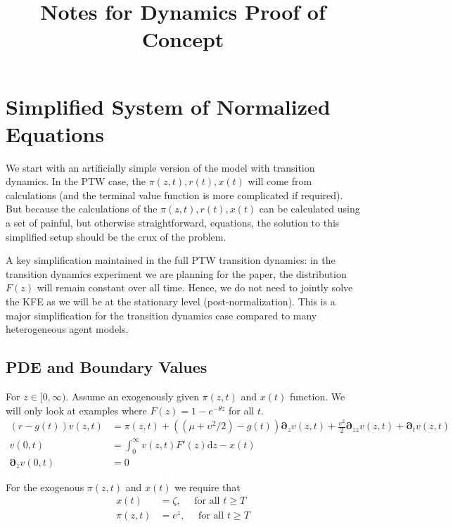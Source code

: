 \documentclass[11pt]{article}
\newcommand{\D}[1][]{\ensuremath{\boldsymbol{\partial}_{#1}}}
\newcommand{\diff}{\ensuremath{\mathrm{d}}}
\begin{document}
\title{Notes for Dynamics Proof of Concept}
\maketitle

\section{Simplified System of Normalized Equations}
We start with an artificially simple version of the model with transition dynamics.  In the PTW case, the $\pi(z,t), r(t), x(t)$ will come from  calculations (and the terminal value function is more complicated if required).  But because the calculations of the $\pi(z,t), r(t), x(t)$ can be calculated using a set of painful, but otherwise straightforward, equations, the solution to this simplified setup should be the crux of the problem.

A key simplification maintained in the full PTW transition dynamics: in the transition dynamics experiment we are planning for the paper, the distribution $F(z)$ will remain constant over all time.  Hence, we do not need to jointly solve the KFE as we will be at the stationary level (post-normalization).  This is a major simplification for the transition dynamics case compared to many heterogeneous agent models.

\subsection{PDE and Boundary Values}
For $z\in[0,\infty)$.  Assume an exogenously given $\pi(z,t)$ and $x(t)$ function.  We will only look at examples where $F(z) = 1 - e^{-\theta z}$ for all $t$.
\begin{align}
	(r - g(t)) v(z,t) &= \pi(z,t) + ((\mu + \upsilon^2/2) - g(t)) \D[z] v(z,t) + \tfrac{\upsilon^2}{2} \D[zz] v(z,t) + \D[t]v(z,t)\label{eq:bellman-GBM-dynamic}	\\
v(0,t) &= \int_{0}^{\infty} v(z,t) F'(z)\diff z - x(t)\label{eq:vm-GBM-dynamic}\\
\D[z]v(0,t) &= 0\label{eq:sp-GBM-dynamic}
\end{align}

For the exogenous $\pi(z,t)$ and $x(t)$ we require that
\begin{align}
x(t) &= \zeta,\quad \text{ for all }t \geq T\label{eq:terminal-x}\\
\pi(z,t) &= e^z,\quad \text{ for all }t \geq T\label{eq:terminal-pi}
\end{align}
\end{document}
